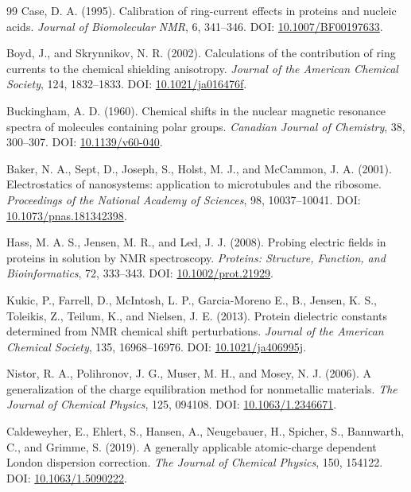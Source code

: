 \documentclass[11pt]{article}
\begin{document}
\begin{thebibliography}{99}
Case, D. A. (1995).
Calibration of ring-current effects in proteins and nucleic acids.
\emph{Journal of Biomolecular NMR}, 6, 341--346.
DOI: \href{https://doi.org/10.1007/BF00197633}{10.1007/BF00197633}.

Boyd, J., and Skrynnikov, N. R. (2002).
Calculations of the contribution of ring currents to the chemical shielding
anisotropy.
\emph{Journal of the American Chemical Society}, 124, 1832--1833.
DOI: \href{https://doi.org/10.1021/ja016476f}{10.1021/ja016476f}.

Buckingham, A. D. (1960).
Chemical shifts in the nuclear magnetic resonance spectra of molecules
containing polar groups.
\emph{Canadian Journal of Chemistry}, 38, 300--307.
DOI: \href{https://doi.org/10.1139/v60-040}{10.1139/v60-040}.

Baker, N. A., Sept, D., Joseph, S., Holst, M. J., and McCammon, J. A. (2001).
Electrostatics of nanosystems: application to microtubules and the ribosome.
\emph{Proceedings of the National Academy of Sciences}, 98, 10037--10041.
DOI: \href{https://doi.org/10.1073/pnas.181342398}{10.1073/pnas.181342398}.

Hass, M. A. S., Jensen, M. R., and Led, J. J. (2008).
Probing electric fields in proteins in solution by NMR spectroscopy.
\emph{Proteins: Structure, Function, and Bioinformatics}, 72, 333--343.
DOI: \href{https://doi.org/10.1002/prot.21929}{10.1002/prot.21929}.

Kukic, P., Farrell, D., McIntosh, L. P., Garcia-Moreno E., B.,
Jensen, K. S., Toleikis, Z., Teilum, K., and Nielsen, J. E. (2013).
Protein dielectric constants determined from NMR chemical shift perturbations.
\emph{Journal of the American Chemical Society}, 135, 16968--16976.
DOI: \href{https://doi.org/10.1021/ja406995j}{10.1021/ja406995j}.

Nistor, R. A., Polihronov, J. G., Muser, M. H., and Mosey, N. J. (2006).
A generalization of the charge equilibration method for nonmetallic materials.
\emph{The Journal of Chemical Physics}, 125, 094108.
DOI: \href{https://doi.org/10.1063/1.2346671}{10.1063/1.2346671}.

Caldeweyher, E., Ehlert, S., Hansen, A., Neugebauer, H., Spicher, S.,
Bannwarth, C., and Grimme, S. (2019).
A generally applicable atomic-charge dependent London dispersion correction.
\emph{The Journal of Chemical Physics}, 150, 154122.
DOI: \href{https://doi.org/10.1063/1.5090222}{10.1063/1.5090222}.


\end{thebibliography}
\end{document}
